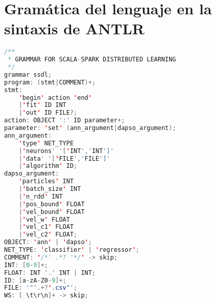 
\chapter{Gramática del lenguaje en la sintaxis de ANTLR}\label{ap:ssdl_g4}

\begin{lstlisting}[language=Java,texcl=false]
/**
 * GRAMMAR FOR SCALA-SPARK DISTRIBUTED LEARNING
 */
grammar ssdl;
program: (stmt|COMMENT)+;
stmt:
    'begin' action 'end'
    |'fit' ID INT
    |'out' ID FILE?;
action: OBJECT ':' ID parameter+;
parameter: 'set' (ann_argument|dapso_argument);
ann_argument:
    'type' NET_TYPE
    |'neurons' '['INT','INT']'
    |'data' '['FILE','FILE']'
    |'algorithm' ID;
dapso_argument:
    'particles' INT
    |'batch_size' INT
    |'n_rdd' INT
    |'pos_bound' FLOAT
    |'vel_bound' FLOAT
    |'vel_w' FLOAT
    |'vel_c1' FLOAT
    |'vel_c2' FLOAT;
OBJECT: 'ann' | 'dapso';
NET_TYPE: 'classifier' | 'regressor';
COMMENT: '/*' .*? '*/' -> skip;
INT: [0-9]+;
FLOAT: INT '.' INT | INT;
ID: [a-zA-Z0-9]+;
FILE: '"'.+?'.csv"';
WS: [ \t\r\n]+ -> skip;
\end{lstlisting}

\endinput
